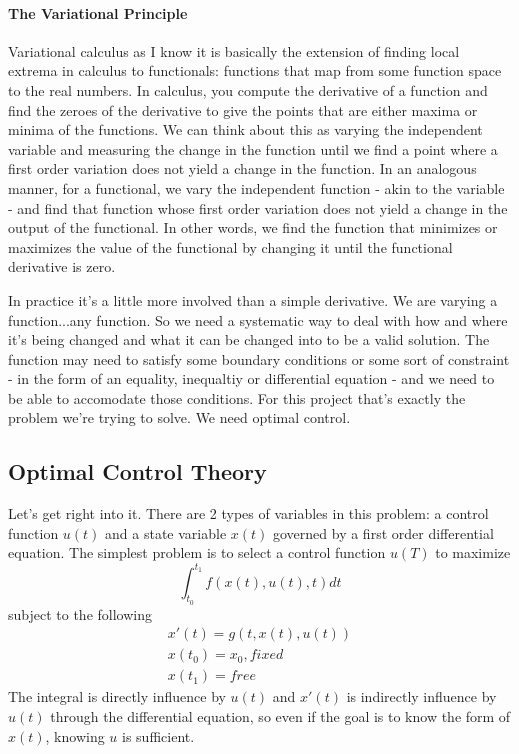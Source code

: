 \documentclass[11pt]{article}
\numberwithin{equation}{section}
\begin{document}
\paragraph{The Variational Principle}
Variational calculus as I know it is basically the extension of finding local extrema in calculus to functionals: functions that map from some function space to the real numbers. In calculus, you compute the derivative of a function and find the zeroes of the derivative to give the points that are either maxima or minima of the functions. We can think about this as varying the independent variable and measuring the change in the function until we find a point where a first order variation does not yield a change in the function. In an analogous manner, for a functional, we vary the independent function - akin to the variable - and find that function whose first order variation does not yield a change in the output of the functional. In other words, we find the function that minimizes or maximizes the value of the functional by changing it until the functional derivative is zero.

In practice it's a little more involved than a simple derivative. We are varying a function...any function. So we need a systematic way to deal with how and where it's being changed and what it can be changed into to be a valid solution. The function may need to satisfy some boundary conditions or some sort of constraint - in the form of an equality, inequaltiy or differential equation - and we need to be able to accomodate those conditions. For this project that's exactly the problem we're trying to solve. We need optimal control.

\subsection{Optimal Control Theory}
Let's get right into it. There are 2 types of variables in this problem: a control function $u(t)$ and a state variable $x(t)$ governed by a first order differential equation. The simplest problem is to select a control function $u(T)$ to maximize
\begin{equation}
\int_{t_0}^{t_1}f(x(t),u(t),t)dt
\end{equation}
subject to the following
\begin{align}
x'(t) = g(t,x(t),u(t)) \\
x(t_0) = x_0, fixed \\
x(t_1) = free
\end{align}
The integral is directly influence by $u(t)$ and $x'(t)$ is indirectly influence by $u(t)$ through the differential equation, so even if the goal is to know the form of $x(t)$, knowing $u$ is sufficient.
\end{document}
